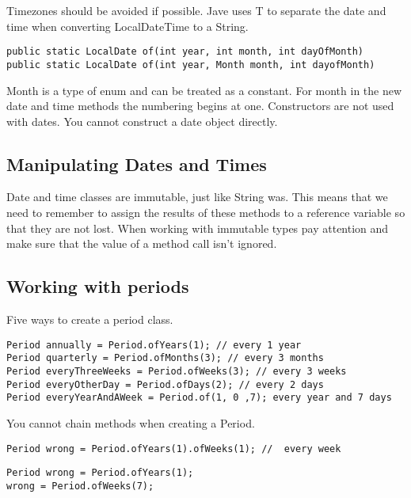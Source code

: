 \documentclass[a4paper]{report}   %
\begin{document}
Timezones should be avoided if possible. Jave uses T to separate the date and time when converting LocalDateTime to a String.

\begin{lstlisting}
public static LocalDate of(int year, int month, int dayOfMonth)
public static LocalDate of(int year, Month month, int dayofMonth)
\end{lstlisting}

Month is a type of enum and can be treated as a constant. For month in the new date and time methods the numbering begins at one. Constructors are not used with dates. You cannot construct a date object directly.

\subsection{Manipulating Dates and Times}

Date and time classes are immutable, just like String was. This means that we need to remember to assign the results of these methods to a reference variable so that they are not lost. When working with immutable types pay attention and make sure that the value of a method call isn't ignored.

\subsection{Working with periods}

Five ways to create a period class.

\begin{lstlisting}
Period annually = Period.ofYears(1); // every 1 year
Period quarterly = Period.ofMonths(3); // every 3 months
Period everyThreeWeeks = Period.ofWeeks(3); // every 3 weeks
Period everyOtherDay = Period.ofDays(2); // every 2 days
Period everyYearAndAWeek = Period.of(1, 0 ,7); every year and 7 days

\end{lstlisting}

You cannot chain methods when creating a Period. 

\begin{lstlisting}
Period wrong = Period.ofYears(1).ofWeeks(1); //  every week
\end{lstlisting}

\begin{lstlisting}
Period wrong = Period.ofYears(1);
wrong = Period.ofWeeks(7);
\end{lstlisting}
\end{document}
